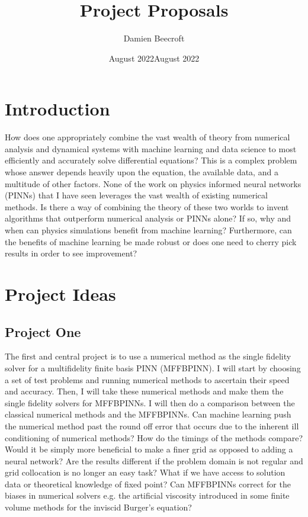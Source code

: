 \documentclass[12pt]{article}
\date{August 2022}
\title{Project Proposals}
\author{Damien Beecroft}
\date{August 2022}
\begin{document}
\maketitle
\section*{Introduction}
How does one appropriately combine the vast wealth of theory from numerical analysis and dynamical systems
with machine learning and data science to most efficiently and accurately solve differential equations?
This is a complex problem whose answer depends heavily upon the equation, the available data, and a multitude of other factors. 
None of the work on physics informed neural networks (PINNs) that I have seen leverages the vast wealth of 
existing numerical methods. Is there a way of combining the theory of these two worlds to invent algorithms
that outperform numerical analysis or PINNs alone? If so, why and when can physics simulations benefit from machine learning?
Furthermore, can the benefits of machine learning be made robust or does one need to cherry pick results in order to see improvement?

\section*{Project Ideas}
\subsection*{Project One}
The first and central project is to use a numerical method as the single fidelity solver for a 
multifidelity finite basis PINN (MFFBPINN). I will start by choosing a set of test problems and 
running numerical methods to ascertain their speed and accuracy. Then, I will take these numerical 
methods and make them the single fidelity solvers for MFFBPINNs. I will then do a comparison 
between the classical numerical methods and the MFFBPINNs. Can machine learning push the numerical
method past the round off error that occurs due to the inherent ill conditioning of numerical methods?
How do the timings of the methods compare? Would it be simply more beneficial to make a finer grid as opposed to 
adding a neural network? Are the results different if the problem domain is not regular and grid collocation 
is no longer an easy task? What if we have access to solution data or theoretical knowledge of fixed point? Can MFFBPINNs correct for the biases 
in numerical solvers e.g. the artificial viscosity introduced in some finite volume
methods for the inviscid Burger's equation?
\end{document}
